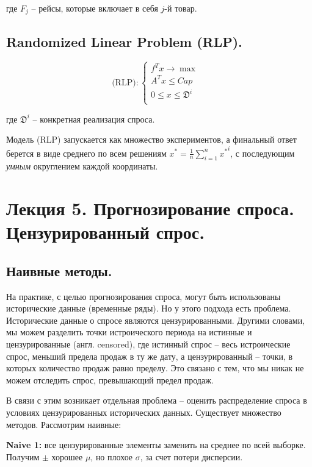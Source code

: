 \documentclass[reqno]{article}
\theoremstyle{definition}
\theoremstyle{definition}
\theoremstyle{definition}
\theoremstyle{definition}
\theoremstyle{definition}
\theoremstyle{definition}
\theoremstyle{definition}
\theoremstyle{definition}
\theoremstyle{definition}
\begin{document}
		где $F_j$ -- рейсы, которые включает в себя $j$-й товар.
		
		\subsection{Randomized Linear Problem (RLP).}
		
		$$
		\text{(RLP)}:
		\begin{cases}
			f^Tx \rightarrow \max & \\
			A^Tx \leq Cap & \\
			0 \leq x \leq \mathfrak{D}^i & \\
		\end{cases}	
		$$
		
		где $\mathfrak{D}^i$ -- конкретная реализация спроса.
		
		Модель (RLP) запускается как множество экспериментов, а финальный ответ берется в виде среднего по всем решениям $x^* = \frac{1}{n}\sum\limits^n_{i = 1} {x^*}^i$, с последующим \textit{умным} округлением каждой координаты.
		
		
		
		\newpage
		\section{Лекция 5. Прогнозирование спроса. Цензурированный спрос.}
		
		\subsection{Наивные методы.}
		
		На практике, с целью прогнозирования спроса, могут быть использованы исторические данные (временные ряды). Но у этого подхода есть проблема. Исторические данные о спросе являются цензурированными. Другими словами, мы можем разделить точки истроического периода на истинные и цензурированные (англ. censored), где истинный спрос -- весь истроические спрос, меньший предела продаж в ту же дату, а цензурированный -- точки, в которых количество продаж равно пределу. Это связано с тем, что мы никак не можем отследить спрос, превышающий предел продаж.
		
		В связи с этим возникает отдельная проблема -- оценить распределение спроса в условиях цензурированных исторических данных. Существует множество методов. Рассмотрим наивные:
		
		\textbf{Naive 1:} все цензурированные элементы заменить на среднее по всей выборке. Получим $\pm$ хорошее $\mu$, но плохое $\sigma$, за счет потери дисперсии.
		
\end{document}
